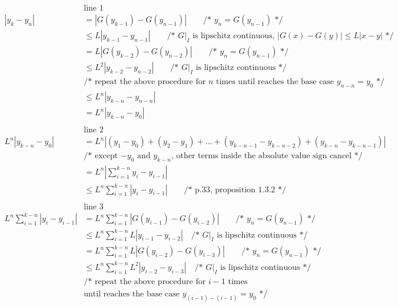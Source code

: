 \documentclass[12pt, border = 4pt, multi]{article} %
\begin{document}
\begin{align*}
&\text{line 1}\\
|y_k - y_n| &= |G(y_{k - 1}) - G(y_{n - 1})| \qquad \text{/* } y_n = G(y_{n - 1}) \text{ */}\\
&\leq L|y_{k - 1} - y_{n - 1}| \qquad \text{/* $G|_I$ is lipschitz continuous, $|G(x) - G(y)| \leq L|x - y|$ */}\\
&= L|G(y_{k - 2}) - G(y_{n - 2})| \qquad \text{/* } y_n = G(y_{n - 1}) \text{ */}\\
&\leq L ^ 2|y_{k - 2} - y_{n - 2}| \qquad \text{/* $G|_I$ is lipschitz continuous */}\\
&\text{/* repeat the above procedure for $n$ times until reaches the base case $y_{n - n} = y_0$ */}\\
&\leq L ^ n|y_{k - n} - y_{n - n}|\\
&= L ^ n|y_{k - n} - y_0|\\
\\
&\text{line 2}\\
L ^ n|y_{k - n} - y_0| &= L ^ n|(y_1 - y_0) + (y_2 - y_1) + ... + (y_{k - n - 1} - y_{k - n - 2}) + (y_{k - n} - y_{k - n - 1})|\\
&\text{/* except $-y_0$ and $y_{k - n}$, other terms inside the absolute value sign cancel */}\\
&= L ^ n\left|\sum_{i = 1} ^ {k - n}y_i - y_{i - 1}\right|\\
&\leq L ^ n \sum_{i = 1} ^ {k - n} \left|y_i - y_{i - 1}\right| \qquad \text{/* p.33, proposition 1.3.2 */}\\
\\
&\text{line 3}\\
L ^ n \sum_{i = 1} ^ {k - n} \left|y_i - y_{i - 1}\right| &= L ^ n \sum_{i = 1} ^ {k - n} \left|G(y_{i - 1}) - G(y_{i - 2})\right| \qquad \text{/* } y_n = G(y_{n - 1}) \text{ */}\\
&\leq L ^ n \sum_{i = 1} ^ {k - n} L\left|y_{i - 1} - y_{i - 2}\right| \quad \text{/* $G|_I$ is lipschitz continuous */}\\
&= L ^ n \sum_{i = 1} ^ {k - n} L\left|G(y_{i - 2}) - G(y_{i - 3})\right| \qquad \text{/* } y_n = G(y_{n - 1}) \text{ */}\\
&\leq L ^ n \sum_{i = 1} ^ {k - n} L ^ 2\left|y_{i - 2} - y_{i - 3}\right| \quad \text{/* $G|_I$ is lipschitz continuous */}\\
&\text{/* repeat the above procedure for $i - 1$ times}\\
&\text{until reaches the base case $y_{(i - 1) - (i - 1)} = y_0$ */}\\

\end{align*}
\end{document}
